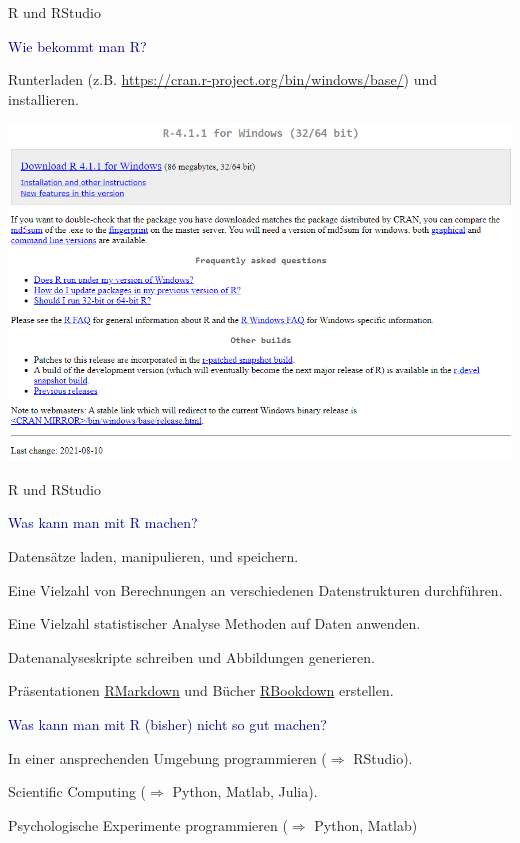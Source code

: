 \documentclass[
  8pt,
  ignorenonframetext,
]{beamer}
\begin{document}
\begin{frame}{R und RStudio}
\protect\hypertarget{r-und-rstudio-1}{}
\large

\textcolor{darkblue}{Wie bekommt man R?} \normalsize

Runterladen (z.B. \url{https://cran.r-project.org/bin/windows/base/})
und installieren. \vspace{2mm}

\begin{center}\includegraphics[width=0.8\linewidth]{2_Abbildungen/pds_2_r_download} \end{center}
\end{frame}

\begin{frame}{R und RStudio}
\protect\hypertarget{r-und-rstudio-2}{}
\large

\textcolor{darkblue}{Was kann man mit R machen?} \normalsize

Datensätze laden, manipulieren, und speichern.

Eine Vielzahl von Berechnungen an verschiedenen Datenstrukturen
durchführen.

Eine Vielzahl statistischer Analyse Methoden auf Daten anwenden.

Datenanalyseskripte schreiben und Abbildungen generieren.

Präsentationen \href{https://bookdown.org/yihui/rmarkdown/}{RMarkdown}
und Bücher \href{https://bookdown.org/yihui/bookdown/}{RBookdown}
erstellen.

\vspace{2mm}

\large

\textcolor{darkblue}{Was kann man mit R (bisher) nicht so gut machen?}
\normalsize

In einer ansprechenden Umgebung programmieren (\(\Rightarrow\) RStudio).

Scientific Computing (\(\Rightarrow\) Python, Matlab, Julia).

Psychologische Experimente programmieren (\(\Rightarrow\) Python,
Matlab)
\end{frame}
\end{document}
